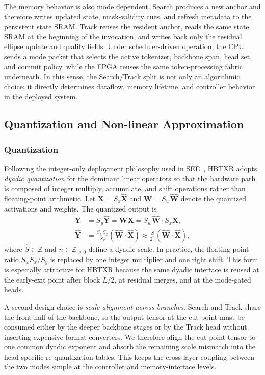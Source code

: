 \documentclass[journal]{IEEEtran}
\begin{document}
The memory behavior is also mode dependent. Search produces a new anchor and therefore writes updated state, mask-validity cues, and refresh metadata to the persistent state SRAM. Track reuses the resident anchor, reads the same state SRAM at the beginning of the invocation, and writes back only the residual ellipse update and quality fields. Under scheduler-driven operation, the CPU sends a mode packet that selects the active tokenizer, backbone span, head set, and commit policy, while the FPGA reuses the same token-processing fabric underneath. In this sense, the Search/Track split is not only an algorithmic choice; it directly determines dataflow, memory lifetime, and controller behavior in the deployed system.

\subsection{Quantization and Non-linear Approximation}

\subsubsection{Quantization}
Following the integer-only deployment philosophy used in SEE~\cite{ref9}, HBTXR adopts \emph{dyadic quantization} for the dominant linear operators so that the hardware path is composed of integer multiply, accumulate, and shift operations rather than floating-point arithmetic. Let $\mathbf X=S_x\hat{\mathbf X}$ and $\mathbf W=S_w\hat{\mathbf W}$ denote the quantized activations and weights. The quantized output is
\begin{align}
\mathbf Y &= S_y\hat{\mathbf Y} = \mathbf W\mathbf X
          = S_w\hat{\mathbf W}\cdot S_x\hat{\mathbf X},\\
\hat{\mathbf Y}
&= \frac{S_wS_x}{S_y}\left(\hat{\mathbf W}\cdot\hat{\mathbf X}\right)
 \approx \frac{\hat S}{2^n}
 \left(\hat{\mathbf W}\cdot\hat{\mathbf X}\right),
\end{align}
where $\hat S \in \mathbb Z$ and $n\in \mathbb Z_{\ge 0}$ define a dyadic scale. In practice, the floating-point ratio $S_wS_x/S_y$ is replaced by one integer multiplier and one right shift. This form is especially attractive for HBTXR because the same dyadic interface is reused at the early-exit point after block $L/2$, at residual merges, and at the mode-gated heads.

A second design choice is \emph{scale alignment across branches}. Search and Track share the front half of the backbone, so the output tensor at the cut point must be consumed either by the deeper backbone stages or by the Track head without inserting expensive format converters. We therefore align the cut-point tensor to one common dyadic exponent and absorb the remaining scale mismatch into the head-specific re-quantization tables. This keeps the cross-layer coupling between the two modes simple at the controller and memory-interface levels.
\end{document}
